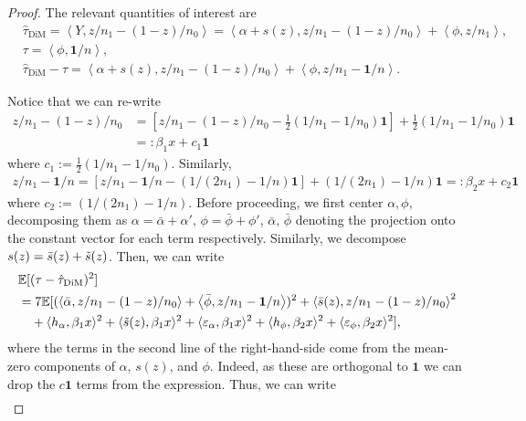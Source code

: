 \documentclass[12pt]{article}
\theoremstyle{definition}
\numberwithin{equation}{section}
\numberwithin{figure}{section}
\newcommand\dotp[1]{\left\langle #1 \right\rangle}
\numberwithin{equation}{section}
\numberwithin{figure}{section}
\begin{document}
\begin{proof}
    The relevant quantities of interest are
    \begin{align}
    &\hat{\tau}_{\text{DiM}} = \dotp{ Y, z/n_1 - (1-z)/n_0}  = \dotp{\alpha + s(z), z/n_1 - (1-z)/n_0 } + \dotp{ \phi, z/n_1 },\\
    &\tau = \dotp{ \phi, \mathbf{1}/n }, \\
    &\hat{\tau}_{\text{DiM}} - \tau = \dotp{\alpha + s(z), z/n_1 - (1-z)/n_0} + \dotp{ \phi,z/n_1 - \mathbf{1}/n }.
    \end{align}
    
    Notice that we can re-write
    \begin{align*}
    z/n_1 - (1-z)/n_0 &= \left[z/n_1 - (1-z)/n_0 - \frac{1}{2}(1/n_1 - 1/n_0) \mathbf{1} \right] +  \frac{1}{2}(1/n_1 - 1/n_0) \mathbf{1}\\
    &=: \beta_1 x + c_1 \mathbf{1}
    \end{align*}
    where $c_1 := \frac{1}{2}(1/n_1 - 1/n_0)$. Similarly,
    \begin{align*}
        z/n_1 - \mathbf{1}/n = [z/n_1 - \mathbf{1}/n - (1/(2n_1)-1/n) \mathbf{1}] + (1/(2n_1)-1/n)\mathbf{1} =: \beta_2 x + c_2 \mathbf{1}
    \end{align*}
    where $c_2 := (1/(2n_1)-1/n)$.
     Before proceeding, we first center $\alpha, \phi$, decomposing them as $\alpha = \bar{\alpha} + \alpha',\, \phi = \bar{\phi} + \phi'$, $\bar{\alpha},\, \bar{\phi}$ denoting the projection onto the constant vector for each term respectively. Similarly, we decompose $s(z) = \bar{s}(z) + \Tilde{s}(z)$. Then, we can write
     \begin{align*}
         &\mathbb{E}[(\tau - \hat{\tau}_{\text{DiM}})^2] \\
         &= 7\mathbb{E}[(\dotp{\bar{\alpha}, z/n_1 - (1-z)/n_0} + \dotp{\bar{\phi},z/n_1 - \mathbf{1}/n })^2 + \dotp{\bar{s}(z), z/n_1 - (1-z)/n_0}^2 \\
         &\quad + \langle h_\alpha, \beta_1 x\rangle^2 + \langle \Tilde{s}(z), \beta_1 x\rangle^2 + \langle \varepsilon_\alpha, \beta_1 x\rangle^2 + \langle h_\phi, \beta_2 x\rangle^2 + \langle \varepsilon_\phi, \beta_2 x\rangle^2],
     \end{align*}
     where the terms in the second line of the right-hand-side come from the mean-zero components of $\alpha$, $s(z)$, and $\phi$. Indeed, as these are orthogonal to $\mathbf{1}$ we can drop the $c \mathbf{1}$ terms from the expression. Thus, we can write
     \begin{align*}

\end{align*}
\end{proof}
\end{document}
